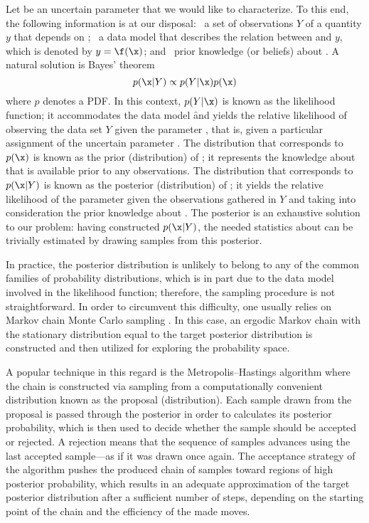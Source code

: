 Let \x be an uncertain parameter that we would like to characterize. To this
end, the following information is at our disposal: \one~a set of observations
$Y$ of a quantity $y$ that depends on \x; \two~a data model \f that describes
the relation between \x and $y$, which is denoted by $y = \f(\x)$; and
\three~prior knowledge (or beliefs) about \x. A natural solution is Bayes'
theorem \cite{gelman2013}
\[
  p(\x | Y) \propto p(Y | \x) p(\x)
\]
where $p$ denotes a \ac{PDF}. In this context, $p(Y | \x)$ is known as the
likelihood function; it accommodates the data model \f and yields the relative
likelihood of observing the data set $Y$ given the parameter \x, that is, given
a particular assignment of the uncertain parameter \x. The distribution that
corresponds to $p(\x)$ is known as the prior (distribution) of \x; it represents
the knowledge about \x that is available prior to any observations. The
distribution that corresponds to $p(\x | Y)$ is known as the posterior
(distribution) of \x; it yields the relative likelihood of the parameter \x
given the observations gathered in $Y$ and taking into consideration the prior
knowledge about \x. The posterior is an exhaustive solution to our problem:
having constructed $p(\x | Y)$, the needed statistics about \x can be trivially
estimated by drawing samples from this posterior.

In practice, the posterior distribution is unlikely to belong to any of the
common families of probability distributions, which is in part due to the data
model involved in the likelihood function; therefore, the sampling procedure is
not straightforward. In order to circumvent this difficulty, one usually relies
on Markov chain Monte Carlo sampling \cite{gelman2013}. In this case, an ergodic
Markov chain with the stationary distribution equal to the target posterior
distribution is constructed and then utilized for exploring the probability
space.

A popular technique in this regard is the Metropolis--Hastings algorithm
\cite{gelman2013} where the chain is constructed via sampling from a
computationally convenient distribution known as the proposal (distribution).
Each sample drawn from the proposal is passed through the posterior in order to
calculates its posterior probability, which is then used to decide whether the
sample should be accepted or rejected. A rejection means that the sequence of
samples advances using the last accepted sample---as if it was drawn once again.
The acceptance strategy of the algorithm pushes the produced chain of samples
toward regions of high posterior probability, which results in an adequate
approximation of the target posterior distribution after a sufficient number of
steps, depending on the starting point of the chain and the efficiency of the
made moves.

